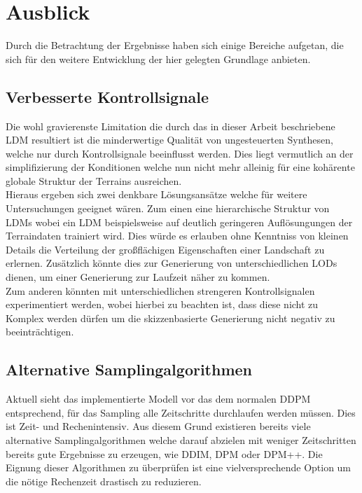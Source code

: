 \section{Ausblick}

Durch die Betrachtung der Ergebnisse haben sich einige Bereiche aufgetan, die sich für den weitere Entwicklung der hier gelegten Grundlage anbieten.  

\subsection{Verbesserte Kontrollsignale}

Die wohl gravierenste Limitation die durch das in dieser Arbeit beschriebene LDM resultiert ist die minderwertige Qualität von ungesteuerten Synthesen, welche nur durch Kontrollsignale beeinflusst werden. Dies liegt vermutlich an der simplifizierung der Konditionen welche nun nicht mehr alleinig für eine kohärente globale Struktur der Terrains ausreichen. \\
Hieraus ergeben sich zwei denkbare Lösungsansätze welche für weitere Untersuchungen geeignet wären. Zum einen eine hierarchische Struktur von LDMs wobei ein LDM beispielsweise auf deutlich geringeren Auflösungungen der Terraindaten trainiert wird. Dies würde es erlauben ohne Kenntniss von kleinen Details die Verteilung der großflächigen Eigenschaften einer Landschaft zu erlernen. Zusätzlich könnte dies zur Generierung von unterschiedlichen LODs dienen, um einer Generierung zur Laufzeit näher zu kommen.\\
Zum anderen könnten mit unterschiedlichen strengeren Kontrollsignalen experimentiert werden, wobei hierbei zu beachten ist, dass diese nicht zu Komplex werden dürfen um die skizzenbasierte Generierung nicht negativ zu beeinträchtigen.  

\subsection{Alternative Samplingalgorithmen}

Aktuell sieht das implementierte Modell vor das dem normalen DDPM entsprechend, für das Sampling alle Zeitschritte durchlaufen werden müssen. Dies ist Zeit- und Rechenintensiv. Aus diesem Grund existieren bereits viele alternative Samplingalgorithmen welche darauf abzielen mit weniger Zeitschritten bereits gute Ergebnisse zu erzeugen, wie DDIM, DPM oder DPM++. Die Eignung dieser Algorithmen zu überprüfen ist eine vielversprechende Option um die nötige Rechenzeit drastisch zu reduzieren.

